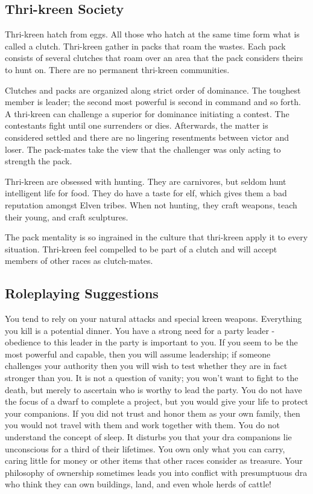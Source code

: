 \subsection{Thri-kreen Society}

Thri-kreen hatch from eggs. All those who hatch at the same time form what is called a clutch. Thri-kreen gather in packs that roam the wastes. Each pack consists of several clutches that roam over an area that the pack considers theirs to hunt on. There are no permanent thri-kreen communities.

Clutches and packs are organized along strict order of dominance. The toughest member is leader; the second most powerful is second in command and so forth. A thri-kreen can challenge a superior for dominance initiating a contest. The contestants fight until one surrenders or dies. Afterwards, the matter is considered settled and there are no lingering resentments between victor and loser. The pack-mates take the view that the challenger was only acting to strength the pack.

Thri-kreen are obsessed with hunting. They are carnivores, but seldom hunt intelligent life for food. They do have a taste for elf, which gives them a bad reputation amongst Elven tribes. When not hunting, they craft weapons, teach their young, and craft sculptures.

The pack mentality is so ingrained in the culture that thri-kreen apply it to every situation. Thri-kreen feel compelled to be part of a clutch and will accept members of other races as clutch-mates.

\subsection{Roleplaying Suggestions}

You tend to rely on your natural attacks and special kreen weapons. Everything you kill is a potential dinner. You have a strong need for a party leader - obedience to this leader in the party is important to you. If you seem to be the most powerful and capable, then you will assume leadership; if someone challenges your authority then you will wish to test whether they are in fact stronger than you. It is not a question of vanity; you won't want to fight to the death, but merely to ascertain who is worthy to lead the party. You do not have the focus of a dwarf to complete a project, but you would give your life to protect your companions. If you did not trust and honor them as your own family, then you would not travel with them and work together with them. You do not understand the concept of sleep. It disturbs you that your dra companions lie unconscious for a third of their lifetimes. You own only what you can carry, caring little for money or other items that other races consider as treasure. Your philosophy of ownership sometimes leads you into conflict with presumptuous dra who think they can own buildings, land, and even whole herds of cattle!

